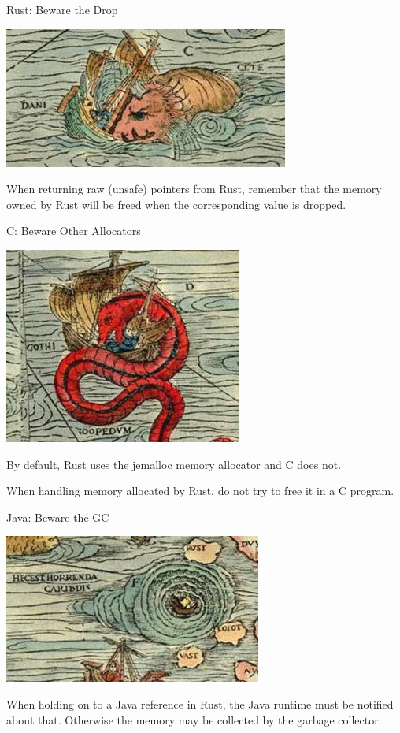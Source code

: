 \documentclass[aspectratio=1610,14pt,t]{beamer}
\begin{document}
\begin{frame}[c]{Rust: Beware the Drop}
  \begin{center}
  \includegraphics[width=.5\textwidth]{img/dragon1.jpg}
  \end{center}

  When returning raw (unsafe) pointers from Rust, remember that the memory owned
  by Rust will be freed when the corresponding value is dropped.
\end{frame}

\begin{frame}[c]{C: Beware Other Allocators}
  \begin{center}
  \includegraphics[width=.3\textwidth]{img/dragon2.jpg}
  \end{center}

  By default, Rust uses the jemalloc memory allocator and C does not.

  When handling memory allocated by Rust, do not try to free it in a C program.
\end{frame}

\begin{frame}[c]{Java: Beware the GC}
  \begin{center}
  \includegraphics[width=.4\textwidth]{img/dragon3.jpg}
  \end{center}

  When holding on to a Java reference in Rust, the Java runtime must be notified
  about that. Otherwise the memory may be collected by the garbage collector.
\end{frame}
\end{document}

